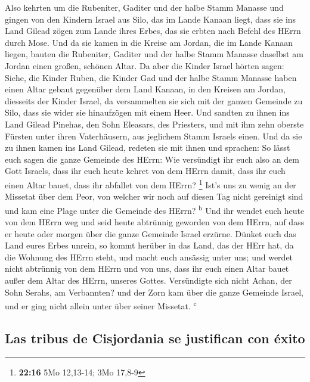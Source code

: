 Also kehrten um die Rubeniter, Gaditer und der halbe
Stamm Manasse und gingen von den Kindern Israel aus Silo, das im Lande
Kanaan liegt, dass sie ins Land Gilead zögen zum Lande ihres Erbes, das
sie erbten nach Befehl des HErrn durch Mose.  Und da sie
kamen in die Kreise am Jordan, die im Lande Kanaan liegen, bauten die
Rubeniter, Gaditer und der halbe Stamm Manasse daselbst am Jordan einen
großen, schönen Altar.  Da aber die Kinder Israel hörten
sagen: Siehe, die Kinder Ruben, die Kinder Gad und der halbe Stamm
Manasse haben einen Altar gebaut gegenüber dem Land Kanaan, in den
Kreisen am Jordan, diesseits der Kinder Israel,  da
versammelten sie sich mit der ganzen Gemeinde zu Silo, dass sie wider
sie hinaufzögen mit einem Heer.  Und sandten zu ihnen ins
Land Gilead Pinehas, den Sohn Eleasars, des Priesters, 
und mit ihm zehn oberste Fürsten unter ihren Vaterhäusern, aus jeglichem
Stamm Israels einen.  Und da sie zu ihnen kamen ins Land
Gilead, redeten sie mit ihnen und sprachen:  So lässt
euch sagen die ganze Gemeinde des HErrn: Wie versündigt ihr euch also an
dem Gott Israels, dass ihr euch heute kehret von dem HErrn damit, dass
ihr euch einen Altar bauet, dass ihr abfallet von dem HErrn? \footnote{\textbf{22:16}
  5Mo 12,13-14; 3Mo 17,8-9}  Ist's uns zu wenig an der
Missetat über dem Peor, von welcher wir noch auf diesen Tag nicht
gereinigt sind und kam eine Plage unter die Gemeinde des HErrn?
\textsuperscript{b}  Und ihr wendet euch heute von dem
HErrn weg und seid heute abtrünnig geworden von dem HErrn, auf dass er
heute oder morgen über die ganze Gemeinde Israel erzürne.
 Dünket euch das Land eures Erbes unrein, so kommt
herüber in das Land, das der HErr hat, da die Wohnung des HErrn steht,
und macht euch ansässig unter uns; und werdet nicht abtrünnig von dem
HErrn und von uns, dass ihr euch einen Altar bauet außer dem Altar des
HErrn, unseres Gottes.  Versündigte sich nicht Achan, der
Sohn Serahs, am Verbannten? und der Zorn kam über die ganze Gemeinde
Israel, und er ging nicht allein unter über seiner Missetat.
\textsuperscript{c}

\hypertarget{las-tribus-de-cisjordania-se-justifican-con-uxe9xito}{%
\subsection{Las tribus de Cisjordania se justifican con
éxito}\label{las-tribus-de-cisjordania-se-justifican-con-uxe9xito}}

